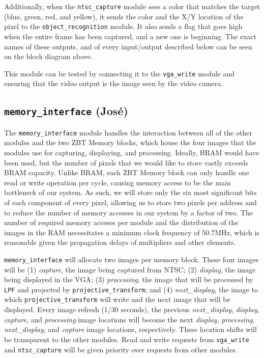 \documentclass[10pt]{article}
\begin{document}
Additionally, when the {\tt ntsc\_capture} module sees a color that matches the target (blue, green, red, and yellow), it sends the color and the X/Y location of the pixel to the {\tt object\_recognition} module. It also sends a flag that goes high when the entire frame has been captured, and a new one is beginning. The exact names of these outputs, and of every input/output described below can be seen on the block diagram above.

This module can be tested by connecting it to the {\tt vga\_write} module and ensuring that the video output is the image seen by the video camera.

\subsection{{\tt memory\_interface} (Jos\'{e})}
The {\tt memory\_interface} module handles the interaction between all of the other modules and the two ZBT Memory blocks, which house the four images that the modules use for capturing, displaying, and processing. Ideally, BRAM would have been used, but the number of pixels that we would like to store vastly exceeds BRAM capacity. Unlike BRAM, each ZBT Memory block can only handle one read or write operation per cycle, causing memory access to be the main bottleneck of our system. As such, we will store only the six most significant bits of each component of every pixel, allowing us to store two pixels per address and to reduce the number of memory accesses in our system by a factor of two. The number of required memory acceses per module and the distribution of the images in the RAM necessitates a minimum clock frequency of 50.7MHz, which is reasonable given the propagation delays of multipliers and other elements.

{\tt memory\_interface} will allocate two images per memory block. These four images will be (1) {\it capture}, the image being captured from NTSC; (2) {\it display}, the image being displayed in the VGA; (3) {\it processing}, the image that will be processed by {\tt LPF} and projected by {\tt projective\_transform}; and (4) {\it next\_display}, the image to which {\tt projective\_transform} will write and the next image that will be displayed. Every image refresh (1/30 seconds), the previous {\it next\_display}, {\it display}, {\it capture}, and {\it processing} image locations will become the next {\it display}, {\it processing}, {\it next\_display}, and {\it capture} image locations, respectively. These location shifts will be transparent to the other modules. Read and write requests from {\tt vga\_write} and {\tt ntsc\_capture} will be given priority over requests from other modules.
\end{document}
